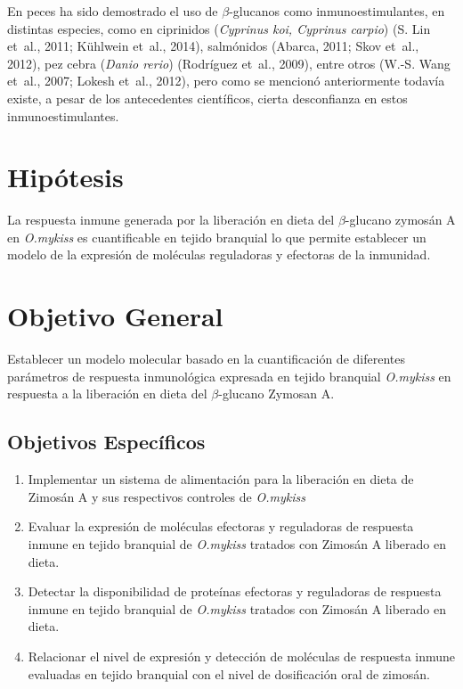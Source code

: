 \documentclass[12pt,letterpaper,oneside]{scrbook}
\begin{document}
En peces ha sido demostrado el uso de \(\beta\)-glucanos como
inmunoestimulantes, en distintas especies, como en ciprinidos
(\emph{Cyprinus koi, Cyprinus carpio}) (S. Lin et~al., 2011; Kühlwein
et~al., 2014), salmónidos (Abarca, 2011; Skov et~al., 2012), pez cebra
(\emph{Danio rerio}) (Rodríguez et~al., 2009), entre otros (W.-S. Wang
et~al., 2007; Lokesh et~al., 2012), pero como se mencionó anteriormente
todavía existe, a pesar de los antecedentes científicos, cierta
desconfianza en estos inmunoestimulantes.

\chapter{Hipótesis}

La respuesta inmune generada por la liberación en dieta del
\(\beta\)-glucano zymosán A en \emph{O.mykiss} es cuantificable en
tejido branquial lo que permite establecer un modelo de la expresión de
moléculas reguladoras y efectoras de la inmunidad.
\chapter{Objetivo General}

Establecer un modelo molecular basado en la cuantificación de diferentes
parámetros de respuesta inmunológica expresada en tejido branquial
\emph{O.mykiss} en respuesta a la liberación en dieta del
\(\beta\)-glucano Zymosan A.

\section{Objetivos Específicos}

\begin{enumerate}
\def\labelenumi{\arabic{enumi}.}
\itemsep1pt\parskip0pt
\item
  Implementar un sistema de alimentación para la liberación en dieta de
  Zimosán A y sus respectivos controles de \emph{O.mykiss}
\item
  Evaluar la expresión de moléculas efectoras y reguladoras de respuesta
  inmune en tejido branquial de \emph{O.mykiss} tratados con Zimosán A
  liberado en dieta.
\item
  Detectar la disponibilidad de proteínas efectoras y reguladoras de
  respuesta inmune en tejido branquial de \emph{O.mykiss} tratados con
  Zimosán A liberado en dieta.
\item
  Relacionar el nivel de expresión y detección de moléculas de respuesta
  inmune evaluadas en tejido branquial con el nivel de dosificación oral
  de zimosán.
\end{enumerate}
\end{document}
